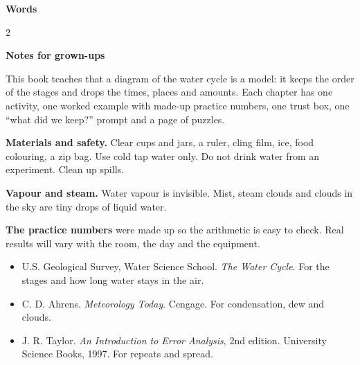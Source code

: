 \clearpage\label{notes}
{\sans\bfseries\LARGE\color{ink} Words}\par
\small
\begin{multicols}{2}
\end{multicols}

\vspace{0.4em}
{\sans\bfseries\large\color{sky!70!black} Notes for grown-ups}\par
This book teaches that a diagram of the water cycle is a model: it keeps the order of the stages and drops the times, places and amounts. Each chapter has one activity, one worked example with made-up practice numbers, one trust box, one ``what did we keep?'' prompt and a page of puzzles.

\textbf{Materials and safety.} Clear cups and jars, a ruler, cling film, ice, food colouring, a zip bag. Use cold tap water only. Do not drink water from an experiment. Clean up spills.

\textbf{Vapour and steam.} Water vapour is invisible. Mist, steam clouds and clouds in the sky are tiny drops of liquid water.

\textbf{The practice numbers} were made up so the arithmetic is easy to check. Real results will vary with the room, the day and the equipment.

\begin{itemize}[leftmargin=1.3em,itemsep=0.2em]
\item U.S. Geological Survey, Water Science School. \emph{The Water Cycle}. For the stages and how long water stays in the air.
\item C. D. Ahrens. \emph{Meteorology Today}. Cengage. For condensation, dew and clouds.
\item J. R. Taylor. \emph{An Introduction to Error Analysis}, 2nd edition. University Science Books, 1997. For repeats and spread.
\end{itemize}

